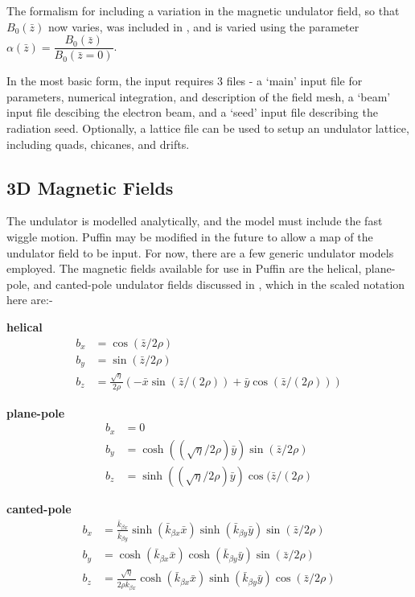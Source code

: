 \documentclass[12pt]{article}%
\begin{document}
The formalism for including a variation in the magnetic undulator field, so that $B_0(\bar{z})$ now varies, was included in \cite{2col}, and is varied using the parameter $\alpha(\bar{z}) = \dfrac{B_0(\bar{z})}{B_0(\bar{z}=0)}$.

In the most basic form, the input requires 3 files - a `main' input file for parameters, numerical integration, and description of the field mesh, a `beam' input file descibing the electron beam, and a `seed' input file describing the radiation seed. Optionally, a lattice file can be used to setup an undulator lattice, including quads, chicanes, and drifts.





\subsection{3D Magnetic Fields}

The undulator is modelled analytically, and the model must include the fast wiggle motion. Puffin may be modified in the future to allow a map of the undulator field to be input. For now, there are a few generic undulator models employed. The magnetic fields available for use in Puffin are the helical, plane-pole, and canted-pole undulator fields discussed in \cite{scharlemann1}, which in the scaled notation here are:-

{\bf helical}
\begin{align}
b_x  & = \cos({\bar{z}/2\rho}) \\
b_y & =  \sin({\bar{z}/2\rho}) \\
b_z & = \frac{\sqrt{\eta}}{2\rho} (-\bar{x}\sin({\bar{z} / (2 \rho)}) + \bar{y}\cos({\bar{z} / (2 \rho)}))
\end{align}


{\bf plane-pole}
\begin{align}
b_x  & = 0 \\
b_y & =  \cosh((\sqrt{\eta}/{2\rho}) \bar{y}) \sin({\bar{z}/2\rho}) \\
b_z & =   \sinh((\sqrt{\eta}/{2\rho}) \bar{y}) \cos({\bar{z} / (2 \rho)}
\end{align}




{\bf canted-pole}
\begin{align}
b_x  & =  \frac{\bar{k}_{\beta x}}{\bar{k}_{\beta y}}  \sinh(\bar{k}_{\beta x} \bar{x} )  \sinh(   \bar{k}_{\beta y} \bar{y}    )   \sin({\bar{z}/2\rho}) \label{cp1} \\
b_y & =   \cosh(\bar{k}_{\beta x} \bar{x} )  \cosh(   \bar{k}_{\beta y} \bar{y}    )   \sin({\bar{z}/2\rho}) \label{cp2}\\
b_z & = \frac{\sqrt{\eta}}{2\rho \bar{k}_{\beta x}}     \cosh(\bar{k}_{\beta x} \bar{x} )    \sinh(   \bar{k}_{\beta y} \bar{y}    )    \cos({\bar{z}/2\rho}) \label{cp3}
\end{align}
\end{document}
